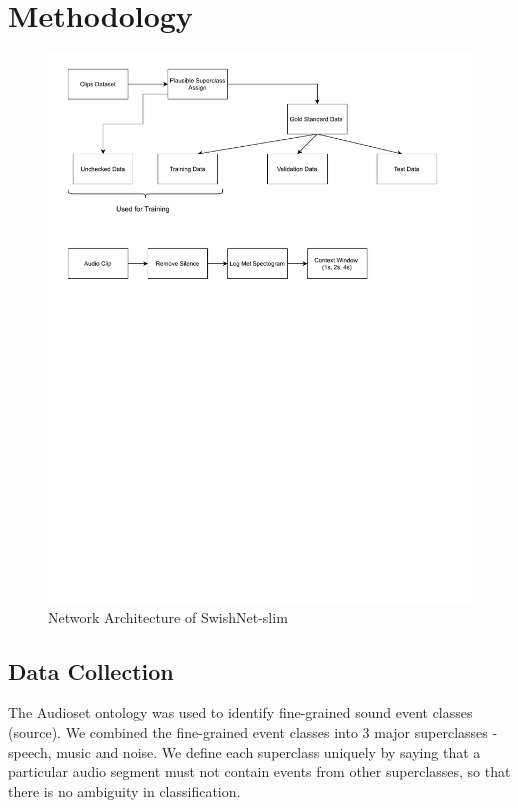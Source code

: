 \documentclass{article}
\begin{document}
\section{Methodology}
\begin{figure}[!t]
	\centering
	\includegraphics[width=\textwidth, trim= 0 450 0 0, clip]{Pipeline.pdf}
	\caption{Network Architecture of SwishNet-slim}
	\label{fig:swishnet}
\end{figure}
\subsection{Data Collection}
The Audioset \cite{gemmeke2017audio} ontology was used to identify fine-grained sound event classes (source). We combined the fine-grained event classes into 3 major superclasses - speech, music and noise. We define each superclass uniquely by saying that a particular audio segment must not contain events from other superclasses, so that there is no ambiguity in classification. 
\end{document}
